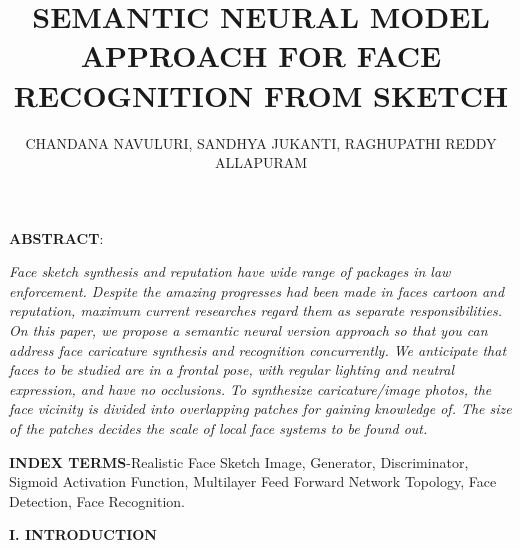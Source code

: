 \documentclass[journal]{IEEEtran} %
\title{\textbf{SEMANTIC NEURAL MODEL APPROACH FOR FACE RECOGNITION FROM SKETCH}}
\author{CHANDANA NAVULURI, SANDHYA JUKANTI, RAGHUPATHI REDDY ALLAPURAM}
\begin{document}
\maketitle


 

\textbf{ABSTRACT}:

\textit{Face sketch synthesis and reputation have wide range of packages in law enforcement. Despite the amazing progresses had been made in faces cartoon and reputation, maximum current researches regard them as  separate responsibilities. On this paper, we propose a semantic neural version approach so that you can address face caricature synthesis and recognition concurrently. We anticipate that faces to be studied are in a frontal pose, with regular lighting and neutral expression, and have no occlusions. To synthesize caricature/image photos, the face vicinity is divided into overlapping patches for gaining knowledge of. The size of the patches decides the scale of local face systems to be found out.}

\textbf{INDEX TERMS}-Realistic Face Sketch Image, Generator, Discriminator, Sigmoid Activation Function, Multilayer Feed Forward Network Topology, Face Detection, Face Recognition.

\textbf{I. INTRODUCTION}
\end{document}

